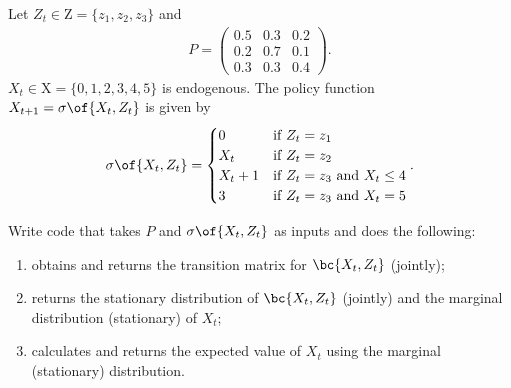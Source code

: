 \documentclass[english,hyperref={pdftex,pdfpagemode=UseNone,hidelinks}]{tufte-handout}
\begin{document}
Let $Z_t \in \text{Z} = \{z_1,z_2,z_3\}$ and \begin{align*}
    P = \begin{pmatrix}
    0.5 & 0.3 & 0.2 \\
    0.2 & 0.7 & 0.1 \\
    0.3 & 0.3 & 0.4
    \end{pmatrix}.
\end{align*}
$X_t \in \text{X}=\{0,1,2,3,4,5\}$ is endogenous. The policy function $X_{t+1}=\sigma\of{X_t,Z_t}$ is given by 
\begin{align*} \label{eq:policy}
    \sigma\of{X_t,Z_t} = \begin{cases}
    0 & \text{if }  Z_t = z_1 \\
    X_t & \text{if } Z_t = z_2 \\    
    X_t + 1 & \text{if } Z_t = z_3 \text{ and } X_t \leq 4\\
    3 & \text{if } Z_t = z_3 \text{ and } X_t = 5    
    \end{cases}.
\end{align*}

Write code that takes $P$ and $\sigma\of{X_t,Z_t}$ as inputs and does the following: 
\begin{enumerate}
\item obtains and returns the transition matrix for $\bc{X_t,Z_t}$ (jointly);
\item returns the stationary distribution of $\bc{X_t,Z_t}$ (jointly) and the marginal distribution (stationary) of $X_t$;
\item calculates and returns the expected value of $X_t$ using the marginal (stationary) distribution. 
\end{enumerate}
\end{document}
